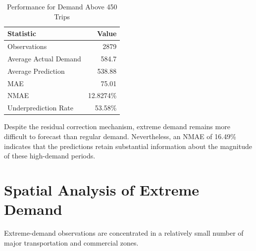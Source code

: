 \documentclass[11pt]{article}
\begin{document}
\begin{table}[H]
\centering
\caption{Performance for Demand Above 450 Trips}
\begin{tabular}{lr}
\toprule
Statistic & Value \\
\midrule
Observations & 2879 \\
Average Actual Demand & 584.7 \\
Average Prediction & 538.88 \\
MAE & 75.01 \\
NMAE & 12.8274\% \\
Underprediction Rate & 53.58\% \\
\bottomrule
\end{tabular}
\end{table}

Despite the residual correction mechanism, extreme demand remains
more difficult to forecast than regular demand. Nevertheless, an
NMAE of 16.49\% indicates that the predictions retain substantial
information about the magnitude of these high-demand periods.


\section{Spatial Analysis of Extreme Demand}

Extreme-demand observations are concentrated in a relatively small
number of major transportation and commercial zones.
\end{document}
